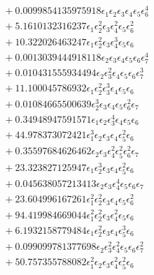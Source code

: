 \documentclass[10pt]{article}
\begin{document}
\begin{align*}
&{}  + 0.0099854135975918 \epsilon_{1} \epsilon_{2} \epsilon_{3} \epsilon_{4} \epsilon_{5} \epsilon_{6}^{4} \\
&{}  + 5.1610132316237 \epsilon_{1} \epsilon_{2}^{2} \epsilon_{3} \epsilon_{4}^{2} \epsilon_{5} \epsilon_{6}^{2} \\
&{}  + 10.322026463247 \epsilon_{1} \epsilon_{2}^{2} \epsilon_{3} \epsilon_{4}^{3} \epsilon_{5} \epsilon_{6} \\
&{}  + 0.0013039444918118 \epsilon_{2} \epsilon_{3} \epsilon_{4} \epsilon_{5} \epsilon_{6} \epsilon_{7}^{4} \\
&{}  + 0.010431555934494 \epsilon_{2} \epsilon_{3}^{2} \epsilon_{4} \epsilon_{5} \epsilon_{6} \epsilon_{7}^{3} \\
&{}  + 11.100045786932 \epsilon_{1} \epsilon_{2}^{2} \epsilon_{3}^{3} \epsilon_{4} \epsilon_{5} \epsilon_{6} \\
&{}  + 0.01084665500639 \epsilon_{2}^{3} \epsilon_{3} \epsilon_{4} \epsilon_{5} \epsilon_{6}^{2} \epsilon_{7} \\
&{}  + 0.34948947591571 \epsilon_{1} \epsilon_{2} \epsilon_{3}^{4} \epsilon_{4} \epsilon_{5} \epsilon_{6} \\
&{}  + 44.978373072421 \epsilon_{1}^{3} \epsilon_{2} \epsilon_{3} \epsilon_{4} \epsilon_{5}^{2} \epsilon_{6} \\
&{}  + 0.35597684626462 \epsilon_{2} \epsilon_{3} \epsilon_{4}^{2} \epsilon_{5}^{2} \epsilon_{6}^{2} \epsilon_{7} \\
&{}  + 23.323827125947 \epsilon_{1} \epsilon_{2}^{3} \epsilon_{3} \epsilon_{4} \epsilon_{5}^{2} \epsilon_{6} \\
&{}  + 0.045638057213413 \epsilon_{2} \epsilon_{3} \epsilon_{4}^{4} \epsilon_{5} \epsilon_{6} \epsilon_{7} \\
&{}  + 23.604996167261 \epsilon_{1}^{2} \epsilon_{2}^{2} \epsilon_{3} \epsilon_{4} \epsilon_{5} \epsilon_{6}^{2} \\
&{}  + 94.419984669044 \epsilon_{1}^{2} \epsilon_{2}^{2} \epsilon_{3} \epsilon_{4}^{2} \epsilon_{5} \epsilon_{6} \\
&{}  + 6.1932158779484 \epsilon_{1} \epsilon_{2}^{2} \epsilon_{3} \epsilon_{4} \epsilon_{5}^{3} \epsilon_{6} \\
&{}  + 0.099099781377698 \epsilon_{2} \epsilon_{3}^{2} \epsilon_{4}^{2} \epsilon_{5} \epsilon_{6} \epsilon_{7}^{2} \\
&{}  + 50.757355788082 \epsilon_{1}^{2} \epsilon_{2} \epsilon_{3} \epsilon_{4}^{2} \epsilon_{5}^{2} \epsilon_{6} \\

\end{align*}
\end{document}
